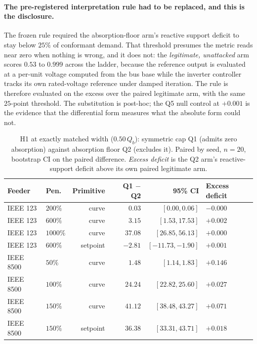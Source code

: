 \paragraph{The pre-registered interpretation rule had to be replaced, and this is the disclosure.}
The frozen rule required the absorption-floor arm's reactive support deficit to stay below $25\%$
of conformant demand. That threshold presumes the metric reads near zero when nothing is wrong,
and it does not: the \emph{legitimate, unattacked} arm scores $0.53$ to $0.999$ across the ladder,
because the reference output is evaluated at a per-unit voltage computed from the bus base while
the inverter controller tracks its own rated-voltage reference under damped iteration. The rule is
therefore evaluated on the excess over the paired legitimate arm, with the same $25$-point
threshold. The substitution is post-hoc; the Q5 null control at $+0.001$ is the evidence that the
differential form measures what the absolute form could not.

\begin{table}[t]
\centering
\caption{H1 at exactly matched width ($0.50\,Q_b$): symmetric cap Q1 (admits zero absorption)
against absorption floor Q2 (excludes it). Paired by seed, $n{=}20$, bootstrap CI on the paired
difference. \emph{Excess deficit} is the Q2 arm's reactive-support deficit above its own paired
legitimate arm.}
\label{tab:h1}
\small
\begin{tabular}{@{}llrrrl@{}}
\toprule
Feeder & Pen. & Primitive & Q1 $-$ Q2 & 95\% CI & Excess deficit \\
\midrule
IEEE 123  & $200\%$  & curve    & $0.03$   & $[0.00, 0.06]$    & $-0.000$ \\
IEEE 123  & $600\%$  & curve    & $3.15$   & $[1.53, 17.53]$   & $+0.002$ \\
IEEE 123  & $1000\%$ & curve    & $37.08$  & $[26.85, 56.13]$  & $+0.000$ \\
IEEE 123  & $600\%$  & setpoint & $-2.81$  & $[-11.73, -1.90]$ & $+0.001$ \\
IEEE 8500 & $50\%$   & curve    & $1.48$   & $[1.14, 1.83]$    & $+0.146$ \\
IEEE 8500 & $100\%$  & curve    & $24.24$  & $[22.82, 25.60]$  & $+0.027$ \\
IEEE 8500 & $150\%$  & curve    & $41.12$  & $[38.48, 43.27]$  & $+0.071$ \\
IEEE 8500 & $150\%$  & setpoint & $36.38$  & $[33.31, 43.71]$  & $+0.018$ \\
\bottomrule
\end{tabular}
\end{table}

